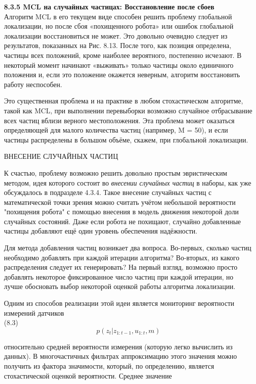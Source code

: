 \documentclass[10pt,a4paper]{article}
\begin{document}
\textbf{8.3.5	MCL на случайных частицах: Восстановление после сбоев}\\

Алгоритм MCL в его текущем виде способен решить проблему глобальной локализации, но после сбоя «похищенного робота» или ошибок глобальной локализации восстановиться не может. Это довольно очевидно следует из результатов, показанных на Рис. 8.13. После того, как позиция определена, частицы всех положений, кроме наиболее вероятного, постепенно исчезают. В некоторый момент начинают «выживать» только частицы около единичного положения и, если это положение окажется неверным, алгоритм восстановить работу неспособен. 

Это существенная проблема и на практике в любом стохастическом алгоритме, такой как MCL, при выполнении перевыборки возможно случайное отбрасывание всех частиц вблизи верного местоположения. Эта проблема может оказаться определяющей для малого количества частиц (например, M = 50), и если частицы распределены в большом объёме, скажем, при глобальной локализации.

ВНЕСЕНИЕ СЛУЧАЙНЫХ ЧАСТИЦ

К счастью, проблему возможно решить довольно простым эвристическим методом, идея которого состоит во \textit{внесении случайных частиц} в наборы, как уже обсуждалось в подразделе 4.3.4. Такое внесение случайных частиц с математической точки зрения можно считать учётом небольшой вероятности "похищения робота" с помощью внесения в модель движения некоторой доли случайных состояний. Даже если робота не похищают, случайно добавленные частицы добавляют ещё один уровень обеспечения надёжности. 

Для метода добавления частиц возникает два вопроса. Во-первых, сколько частиц необходимо добавлять при каждой итерации алгоритма? Во-вторых, из какого распределения следует их генерировать? На первый взгляд, возможно просто добавлять некоторое фиксированное число частиц при каждой итерации, но лучше обосновать выбор некоторой оценкой работы алгоритма локализации. 

Одним из способов реализации этой идеи является мониторинг вероятности измерений датчиков \\

(8.3)
$$p(z_t|z_{1:t-1},u_{1:t},m)$$

относительно средней вероятности измерения (которую легко вычислить из данных). В многочастичных фильтрах аппроксимацию этого значения можно получить из фактора значимости, который, по определению, является стохастической оценкой вероятности. Среднее значение
\\
\end{document}
